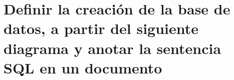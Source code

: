 %
%

\section{Definir la creación de la base de datos, a partir del siguiente diagrama y anotar la sentencia SQL en un documento}
